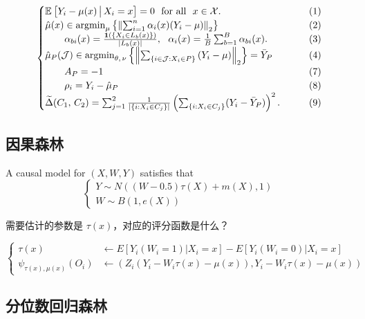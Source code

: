 \documentclass[aos]{imsart}
\theoremstyle{plain}
\theoremstyle{definition}
\theoremstyle{remark}
\begin{document}
\begin{CJK}{UTF8}{gbsn}
\begin{equation*}
\begin{cases}
\EE{ Y_i - \mu(x) \cond X_i = x} = 0 \ \text{ for all } \ x \in \xx. &\qquad (1) \\
\hmu(x) \in \argmin_{\mu} \cb{\Norm{\sum_{i = 1}^n \alpha_i(x)(Y_i-\mu)}_2} &\qquad (2) \\
\qquad  \alpha_{bi}(x) = \frac{\1\p{\cb{X_i \in L_b(x)}}}{\abs{L_b(x)}}, \ \ \alpha_i(x) = \frac{1}{B} \sum_{b = 1}^B \alpha_{bi}(x).  &\qquad (3) \\
\hmu_P(\mathcal{J}) \in \argmin_{\theta, \, \nu} \cb{\Norm{\sum_{\cb{i\in\mathcal{J} : X_i \in P}} \, (Y_i-\mu)}_2} = \bar{Y}_P   &\qquad (4) \\
\qquad A_P = -1 &\qquad (7) \\
\qquad  \rho_i =  Y_i - \hmu_P &\qquad (8) \\
\tDelta(C_1, \, C_2) =  \sum_{j = 1}^2\frac{1}{\abs{\cb{i : X_i \in C_j}}}\p{ \sum_{\cb{i : X_i \in C_j}} (Y_i - \bar{Y}_P)}^2. &\qquad (9)
\end{cases}
\end{equation*}

\subsection{因果森林}

A causal model for $(X, W, Y)$ satisfies that
\begin{equation*}
\begin{cases}
Y  \sim N((W-0.5)\tau(X) + m(X), 1) \\
W  \sim B(1,  e(X))
\end{cases}
\end{equation*}

需要估计的参数是 $\tau(x)$，对应的评分函数是什么？


\begin{equation*}
\begin{cases}
\tau(x) &\leftarrow E[Y_i(W_i=1)|X_i=x] - E[Y_i(W_i=0)|X_i=x] \\
\psi_{\tau(x), \mu(x)}(O_i) &\leftarrow (Z_i(Y_i - W_i \tau(x) - \mu(x)),  Y_i - W_i \tau(x) - \mu(x))
\end{cases}
\end{equation*}








\subsection{分位数回归森林}


\end{CJK}
\end{document}
